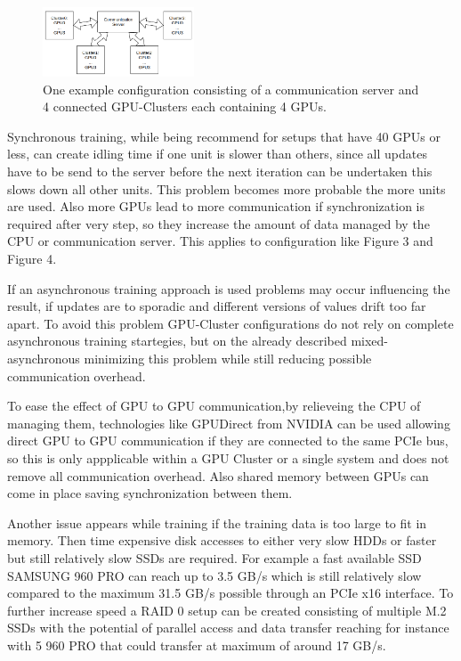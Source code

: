 \documentclass[conference]{IEEEtran}
\begin{document}
\begin{figure}
\centering
\includegraphics[width=0.4\textwidth]{cluster_setup.png}
\caption{One example configuration consisting of a communication server and 4 connected GPU-Clusters each containing 4 GPUs.}
\end{figure}
Synchronous training, while being recommend for setups that have 40 GPUs or less, can create idling time if one unit is slower than others, since all updates have to be send to the server before the next iteration can be undertaken this slows down all other units. This problem becomes more probable the more units are used. Also more GPUs lead to more communication if synchronization is required after very step, so they increase the amount of data managed by the CPU or communication server. This applies to configuration like Figure 3 and Figure 4.

If an asynchronous training approach is used problems may occur influencing the result, if updates are to sporadic and different versions of values drift too far apart. To avoid this problem GPU-Cluster configurations do not rely on complete asynchronous training startegies, but on the already described mixed-asynchronous minimizing this problem while still reducing possible communication overhead.

To ease the effect of GPU to GPU communication,by relieveing the CPU of managing them, technologies like GPUDirect from NVIDIA\cite{nvidiagpudirect2017} can be used allowing direct GPU to GPU communication if they are connected to the same PCIe bus, so this is only appplicable within a GPU Cluster or a single system and does not remove all communication overhead. Also shared memory between GPUs can come in place saving synchronization between them.

Another issue appears while training if the training data is too large to fit in memory. Then time expensive disk accesses to either very slow HDDs or faster but still relatively slow SSDs are required. For example a fast available SSD SAMSUNG 960 PRO can reach up to 3.5 GB/s which is still relatively slow compared to the maximum 31.5 GB/s possible through an PCIe x16 interface. To further increase speed a RAID 0 setup can be created consisting of multiple M.2 SSDs with the potential of parallel access and data transfer reaching for instance with 5 960 PRO that could transfer at maximum of around 17 GB/s.
\end{document}
